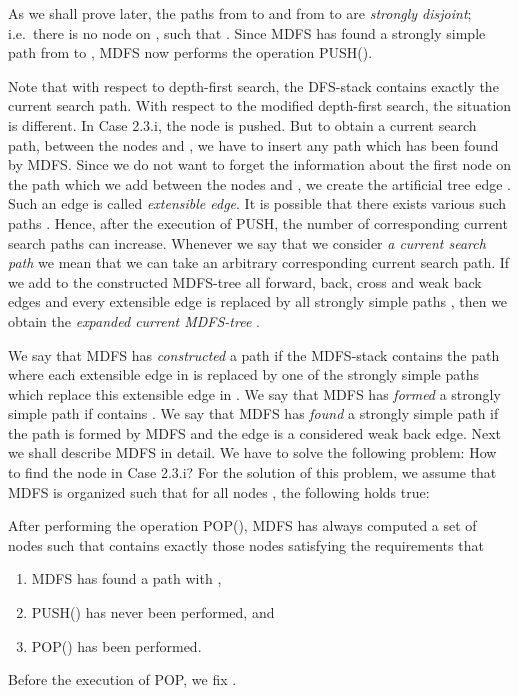 \documentclass[12pt,twoside,a4paper]{article}
\begin{document}
As we shall prove later, the paths  from  to  and  from
 to  are {\em strongly disjoint\/}; i.e.\ there is no node 
on ,  such that . 
Since MDFS has found a strongly simple path  from  to , MDFS now performs 
the operation PUSH().

\medskip
Note that with respect to depth-first search, the DFS-stack contains exactly
the current search path. With respect to the modified depth-first search,
the situation is different. In Case 2.3.i, the node  is pushed. But
to obtain a current search path, between the nodes  and ,
we have to insert any path  which has been found by MDFS.
Since we do not want to forget the information about the first node 
on the path which we add between the nodes  and , we 
create the artificial tree edge . Such an edge is
called {\em extensible edge}. It is possible that there exists various such
paths . Hence, after the execution of PUSH, the number of
corresponding current search paths can increase. 
Whenever we say that we consider {\em a current search path\/} we mean that we can
take an arbitrary corresponding current search path. If we add to the
constructed MDFS-tree  all forward, back, cross and weak back edges and  
every extensible edge  is replaced by all strongly simple 
paths , then
we obtain the {\em expanded current MDFS-tree\/} .

We say that MDFS has {\em constructed\/} a path  if the MDFS-stack  contains the 
path  where each extensible edge  in  is replaced by one
of the strongly simple paths  which replace this extensible
edge in . 
We say that MDFS has {\em formed\/} a strongly simple path  if  contains 
. We say that MDFS has {\em found\/} a strongly simple path  if 
the path  is formed by MDFS and the edge  is a considered 
weak back edge.
Next we shall describe MDFS in detail. 
We have to solve the following
problem: How to find the node  in Case 2.3.i?
For the solution of this problem, we assume that MDFS is organized such that 
for all nodes , the following holds true:

\medskip
After performing the operation POP(), MDFS has always computed a
set  of nodes such that  contains exactly those
nodes  satisfying the requirements that  \label{WM1}
\begin{enumerate}
\item MDFS has found a path  with ,
\item PUSH() has never been performed, and
\item POP() has been performed.
\end{enumerate}
Before the execution of POP, we fix . 
\end{document}
